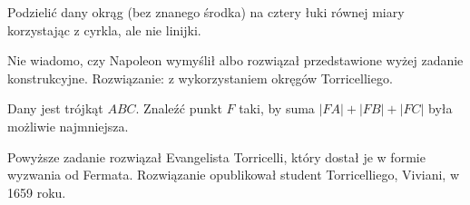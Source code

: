\color{red}

\begin{problem}
	Podzielić dany okrąg (bez znanego środka) na cztery łuki równej miary korzystając z cyrkla, ale nie linijki.
\end{problem}

Nie wiadomo, czy Napoleon wymyślił albo rozwiązał przedstawione wyżej zadanie konstrukcyjne.
Rozwiązanie: \cite[s. 116]{neugebauer} z wykorzystaniem okręgów Torricelliego.
%

\begin{problem}
	Dany jest trójkąt $ABC$.
	Znaleźć punkt $F$ taki, by suma $|FA| + |FB| + |FC|$ była możliwie najmniejsza.
\end{problem}

Powyższe zadanie rozwiązał Evangelista Torricelli, który dostał je w formie wyzwania od Fermata.
Rozwiązanie opublikował student Torricelliego, Viviani, w 1659 roku.


\color{black}